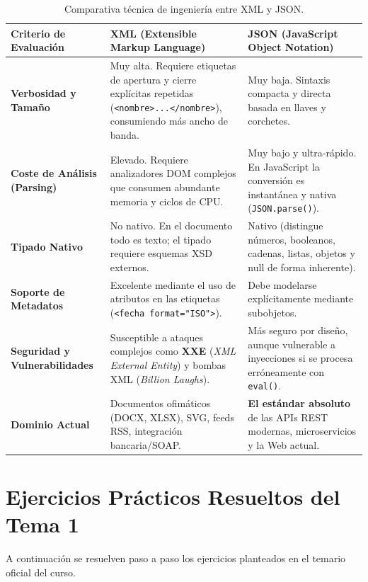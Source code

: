 \begin{table}[htbp]
\centering
\caption{Comparativa técnica de ingeniería entre XML y JSON.}
\label{tab:xml-vs-json}
\small
\begin{tabularx}{\textwidth}{>{\raggedright\arraybackslash\bfseries}p{3cm} X X}
\toprule
\textbf{Criterio de Evaluación} & \textbf{XML (Extensible Markup Language)} & \textbf{JSON (JavaScript Object Notation)} \\
\midrule
\textbf{Verbosidad y Tamaño} & Muy alta. Requiere etiquetas de apertura y cierre explícitas repetidas (\texttt{<nombre>...</nombre>}), consumiendo más ancho de banda. & Muy baja. Sintaxis compacta y directa basada en llaves y corchetes. \\
\textbf{Coste de Análisis (Parsing)} & Elevado. Requiere analizadores DOM complejos que consumen abundante memoria y ciclos de CPU. & Muy bajo y ultra-rápido. En JavaScript la conversión es instantánea y nativa (\texttt{JSON.parse()}). \\
\textbf{Tipado Nativo} & No nativo. En el documento todo es texto; el tipado requiere esquemas XSD externos. & Nativo (distingue números, booleanos, cadenas, listas, objetos y null de forma inherente). \\
\textbf{Soporte de Metadatos} & Excelente mediante el uso de atributos en las etiquetas (\texttt{<fecha format="ISO">}). & Debe modelarse explícitamente mediante subobjetos. \\
\textbf{Seguridad y Vulnerabilidades} & Susceptible a ataques complejos como \textbf{XXE} (\textit{XML External Entity}) y bombas XML (\textit{Billion Laughs}). & Más seguro por diseño, aunque vulnerable a inyecciones si se procesa erróneamente con \texttt{eval()}. \\
\textbf{Dominio Actual} & Documentos ofimáticos (DOCX, XLSX), SVG, feeds RSS, integración bancaria/SOAP. & \textbf{El estándar absoluto} de las APIs REST modernas, microservicios y la Web actual. \\
\bottomrule
\end{tabularx}
\end{table}
\section{Ejercicios Prácticos Resueltos del Tema 1}

A continuación se resuelven paso a paso los ejercicios planteados en el temario oficial del curso.

